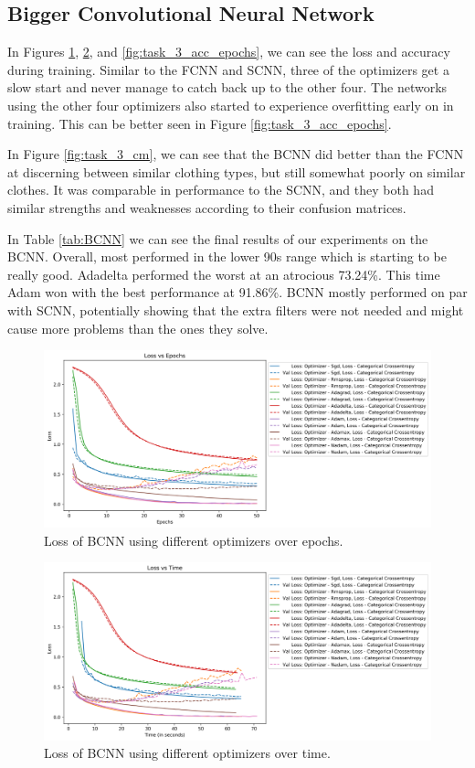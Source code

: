 \documentclass[12pt]{article}
\begin{document}
\subsection{Bigger Convolutional Neural Network}

In Figures \ref{fig:task_3_loss_epochs}, \ref{fig:task_3_loss_time}, and \ref{fig:task_3_acc_epochs}, we can see
 the loss and accuracy during training.
Similar to the FCNN and SCNN, three of the optimizers get a slow start and never manage to catch back up to the other four.
The networks using the other four optimizers also started to experience overfitting early on in training.
This can be better seen in Figure \ref{fig:task_3_acc_epochs}.

In Figure \ref{fig:task_3_cm}, we can see that the BCNN did better than the FCNN
 at discerning between similar clothing types, but still somewhat poorly on similar clothes.
It was comparable in performance to the SCNN, and they both had similar strengths and weaknesses according to their confusion matrices.

In Table \ref{tab:BCNN} we can see the final results of our experiments on the BCNN.
Overall, most performed in the lower 90s range which is starting to be really good.
Adadelta performed the worst at an atrocious 73.24\%.
This time Adam won with the best performance at 91.86\%.
BCNN mostly performed on par with SCNN, potentially showing that the extra filters were not needed and might cause more problems than the ones they solve.

\begin{figure}
  \centering
  \includegraphics[width=\linewidth]{task_3_loss_epochs.png}
  \caption{Loss of BCNN using different optimizers over epochs.}
  \label{fig:task_3_loss_epochs}
\end{figure}

\begin{figure}
  \centering
  \includegraphics[width=\linewidth]{task_3_loss_time.png}
  \caption{Loss of BCNN using different optimizers over time.}
  \label{fig:task_3_loss_time}
\end{figure}
\end{document}
